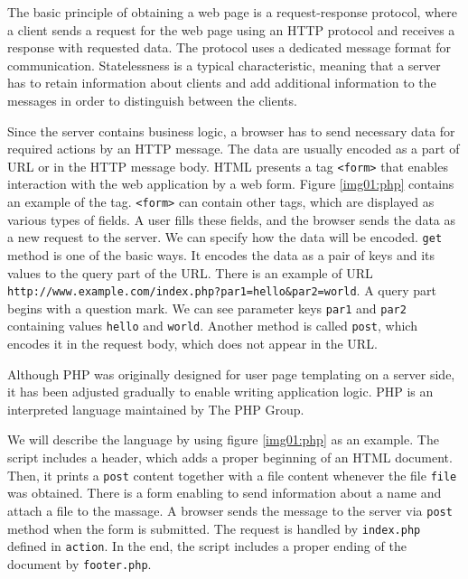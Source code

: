 The basic principle of obtaining a web page is a request-response protocol, where a client sends a request for the web page using an HTTP protocol and receives a response with requested data.
The protocol uses a dedicated message format for communication.
Statelessness is a typical characteristic, meaning that a server has to retain information about clients and add additional information to the messages in order to distinguish between the clients.
\par
Since the server contains business logic, a browser has to send necessary data for required actions by an HTTP message.
The data are usually encoded as a part of \ac{URL} or in the HTTP message body.
HTML presents a tag \texttt{<form>} that enables interaction with the web application by a web form.
Figure \ref{img01:php} contains an example of the tag.
\texttt{<form>} can contain other tags, which are displayed as various types of fields.
A user fills these fields, and the browser sends the data as a new request to the server.
We can specify how the data will be encoded.
\texttt{get} method is one of the basic ways.
It encodes the data as a pair of keys and its values to the query part of the URL.
There is an example of URL
\texttt{http://www.example.com/index.php?par1=hello\&par2=world}.
A query part begins with a question mark.
We can see parameter keys \texttt{par1} and \texttt{par2} containing values \texttt{hello} and \texttt{world}.
Another method is called \texttt{post}, which encodes it in the request body, which does not appear in the URL.
\par
Although PHP  was originally designed for user page templating on a server side, it has been adjusted gradually to enable writing application logic.
PHP is an interpreted language maintained by The PHP Group.
\par
We will describe the language by using figure \ref{img01:php} as an example.
The script includes a header, which adds a proper beginning of an HTML document.
Then, it prints a \texttt{post} content together with a file content whenever the file \texttt{file} was obtained.
There is a form enabling to send information about a name and attach a file to the massage.
A browser sends the message to the server via \texttt{post} method when the form is submitted.
The request is handled by \texttt{index.php} defined in \texttt{action}.
In the end, the script includes a proper ending of the document by \texttt{footer.php}.
\par
